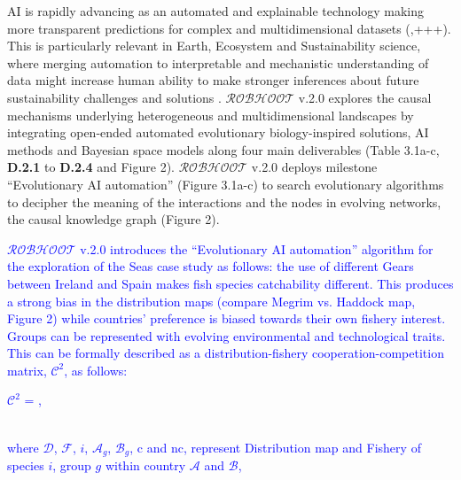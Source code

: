 \documentclass[11pt, a4paper]{article} %
\begin{document}
{AI is rapidly advancing as an automated and explainable technology
making more transparent predictions for complex and multidimensional
datasets
(\citep{OHare2015,Gil2019,Cranmer2019,Guimera2020,Real2020,Futia2020},+++). This
is particularly relevant in Earth, Ecosystem and Sustainability
science, where merging automation to interpretable and mechanistic
understanding of data might increase human ability to make stronger
inferences about future sustainability challenges and solutions
\citep{Reichstein}. $\mathcal{ROBHOOT}$ v.2.0 explores the causal
mechanisms underlying heterogeneous and multidimensional landscapes by
integrating open-ended automated evolutionary biology-inspired
solutions, AI methods and Bayesian space models along four main
deliverables (Table 3.1a-c, {\bf D.2.1} to {\bf D.2.4} and Figure
2). $\mathcal{ROBHOOT}$ v.2.0 deploys milestone ``Evolutionary AI
automation'' (Figure 3.1a-c) to search evolutionary algorithms to
decipher the meaning of the interactions and the nodes in evolving
networks, the causal knowledge graph (Figure
2). \textcolor{blue}{$\mathcal{ROBHOOT}$ v.2.0 introduces the
  ``Evolutionary AI automation'' algorithm for the exploration of the
  Seas case study as follows: the use of different Gears between
  Ireland and Spain makes fish species catchability different. This
  produces a strong bias in the distribution maps (compare Megrim
  vs. Haddock map, Figure 2) while countries' preference is biased
  towards their own fishery interest. Groups can be represented with
  evolving environmental and technological traits. This can be
  formally described as a distribution-fishery
  cooperation-competition matrix,  $\mathcal{C}^2$, as follows: \vspace{0.1 in}\\
\begin{center}
  $\mathcal{C}^2$ = , \vspace{0.2 in}
\end{center}
\\
where $\mathcal{D}$, $\mathcal{F}$, $i$, $\mathcal{A}_{g}$,
$\mathcal{B}_{g}$, c and nc, represent Distribution map and Fishery of
species $i$, group $g$ within country $\mathcal{A}$ and $\mathcal{B}$,
}}
\end{document}
